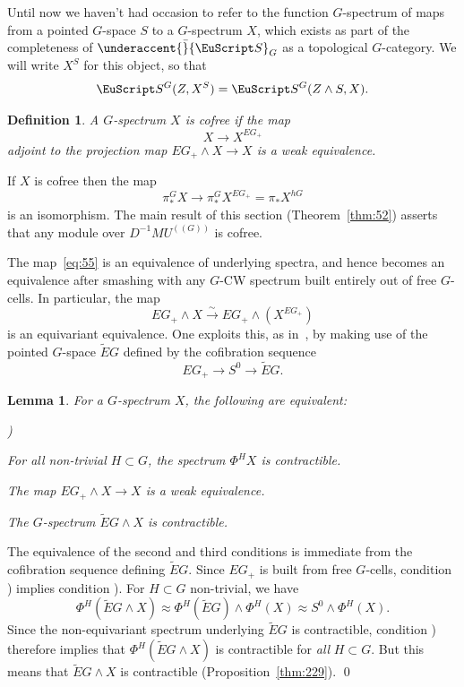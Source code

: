 \documentclass{amsart}
\newtheorem{lem}[equation]{Lemma}
\newtheorem{definition}[equation]{Definition}
\newenvironment{defin}{\begin{definition}\rm}{\end{definition}}
\theoremstyle{definition}
\newtheorem{defin}[equation]{Definition}
\theoremstyle{remark}
\newenvironment{pf}{\bigskip{\em Proof:\/}}{\qed\medskip}
\newcounter{thmItem}
\newcommand{\thmListItem}[1]{\rm \romannumeral#1)}
\newenvironment{thmList}{\begin{list}%
{\rm \roman{thmItem})}{\usecounter{thmItem}
\setlength{\labelwidth}{2em}
\setlength{\itemindent}{2em}
\setlength{\leftmargin}{0pt}
\setlength{\listparindent}{0pt}
\setlength{\parsep}{0pt}
\setlength{\partopsep}{0pt}
\setlength{\itemsep}{\medskipamount}
\setlength{\topsep}{\medskipamount}
}}{\end{list}}
\newcommand{\spectra}{\EuScript S}
\newcommand{\mutn}[1]{MU^{(\!(#1)\!)}}
\newcommand{\gfp}[1]{\Phi^{#1}}
\newcommand{\phih}{\gfp{H}}
\newcommand{\gspectra}[1]{\underaccent{\bar}{\spectra}_{#1}}
\newcommand{\ugspectra}[1]{\spectra^{#1}}
\begin{document}
Until now we haven't had occasion to refer to the function
$G$-spectrum of maps from a pointed $G$-space $S$ to a $G$-spectrum
$X$, which exists as part of the completeness of $\gspectra{G}$ as a
topological $G$-category.    We will write $X^{S}$ for this object, so
that 
\[
\ugspectra{G}(Z,X^{S}) = \ugspectra{G}(Z\wedge S, X).
\]

\begin{defin}
\label{def:11}
A $G$-spectrum $X$ is {\em cofree} if the map
\begin{equation}
\label{eq:55}
X\to X^{EG_{+}}
\end{equation}
adjoint to the projection map $EG_{+}\wedge X\to X$ is a weak
equivalence.
\end{defin}


If $X$ is cofree then the map
\[
\pi^{G}_{\ast}X \to \pi^{G}_{\ast}X^{EG_{+}} = \pi_{\ast}X^{hG}
\]
is an isomorphism.  The main result of this section
(Theorem~\ref{thm:52}) asserts that any module over $D^{-1}\mutn{G}$
is cofree.

The map~\eqref{eq:55} is an equivalence of underlying spectra, and
hence becomes an equivalence after smashing with any $G$-CW spectrum 
built entirely out of free $G$-cells.   In particular, the map
\begin{equation}
\label{eq:98}
EG_{+}\wedge X\xrightarrow{\sim}{} EG_{+}\wedge (X^{EG_{+}})
\end{equation}
is an equivariant equivalence.  One exploits this, as
in~\cite{MR763905}, by making use of the pointed $G$-space $\tilde EG$
defined by the cofibration sequence
\begin{equation}
\label{eq:12}
EG_{+}\to S^{0}\to \tilde EG.
\end{equation}

\begin{lem}
\label{thm:166}
For a $G$-spectrum $X$, the following are equivalent:
\begin{thmList}
\item For all non-trivial $H\subset G$, the spectrum $\phih X$ is
contractible.
\item The map $EG_{+}\wedge X\to X$ is a weak equivalence.
\item The $G$-spectrum $\tilde EG\wedge X$ is contractible.
\end{thmList}
\end{lem}

\begin{pf}
The equivalence of the second and third conditions is immediate from
the cofibration sequence defining $\tilde EG$.    Since $EG_{+}$ is
built from free $G$-cells, condition \thmListItem{2}  implies condition \thmListItem{1}.
For $H\subset G$ non-trivial, we have 
\[
\phih(\tilde EG\wedge X)\approx
\phih(\tilde EG)\wedge \phih(X)\approx
S^{0}\wedge \phih(X).
\]
Since the non-equivariant spectrum underlying $\tilde EG$ is
contractible, condition \thmListItem{1} therefore implies that $\phih(\tilde
EG\wedge X)$ is contractible for {\em all} $H\subset G$.  But this
means that $\tilde EG\wedge X$ is contractible
(Proposition~\ref{thm:229}).
\end{pf}
\end{document}
